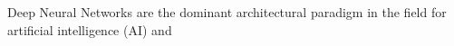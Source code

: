 	Deep Neural Networks are the dominant architectural paradigm in the field for artificial intelligence (AI) and 


